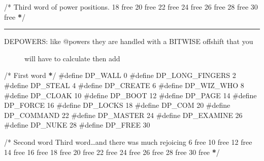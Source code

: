 \documentclass[letterpaper,10pt,english]{sphinxmanual}
\begin{document}
\sphinxAtStartPar
/* Third word of power positions.  18 free \sphinxstyleemphasis{/
/} 20 free \sphinxstyleemphasis{/
/} 22 free \sphinxstyleemphasis{/
/} 24 free \sphinxstyleemphasis{/
/} 26 free \sphinxstyleemphasis{/
/} 28 free \sphinxstyleemphasis{/
/} 30 free {\color{red}\bfseries{}*}/


\bigskip\hrule\bigskip

\begin{description}
\item[{DEPOWERS:  like @powers they are handled with a BITWISE offshift that you}] \leavevmode
\sphinxAtStartPar
will have to calculate then add

\end{description}

\sphinxAtStartPar
/* First word {\color{red}\bfseries{}*}/
\#define DP\_WALL                 0
\#define DP\_LONG\_FINGERS         2
\#define DP\_STEAL                4
\#define DP\_CREATE               6
\#define DP\_WIZ\_WHO              8
\#define DP\_CLOAK                10
\#define DP\_BOOT                 12
\#define DP\_PAGE                 14
\#define DP\_FORCE                16
\#define DP\_LOCKS                18
\#define DP\_COM                  20
\#define DP\_COMMAND              22
\#define DP\_MASTER               24
\#define DP\_EXAMINE              26
\#define DP\_NUKE                 28
\#define DP\_FREE                 30

\sphinxAtStartPar
/* Second word  Third word…and there was much rejoicing  6  free  10 free \sphinxstyleemphasis{/
/} 12 free \sphinxstyleemphasis{/
/} 14 free \sphinxstyleemphasis{/
/} 16 free \sphinxstyleemphasis{/
/} 18 free \sphinxstyleemphasis{/
/} 20 free \sphinxstyleemphasis{/
/} 22 free \sphinxstyleemphasis{/
/} 24 free \sphinxstyleemphasis{/
/} 26 free \sphinxstyleemphasis{/
/} 28 free \sphinxstyleemphasis{/
/} 30 free {\color{red}\bfseries{}*}/
\end{document}
